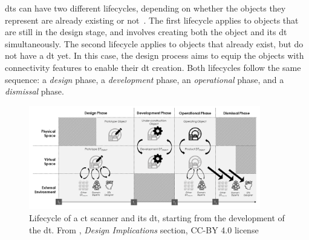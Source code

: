 \acrshort{dt}s can have two different lifecycles, depending on whether the objects they represent are already existing or not~\parencite{barricelliSurveyDigitalTwin2019}. The first lifecycle applies to objects that are still in the design stage, and involves creating both the object and its \acrshort{dt} simultaneously. The second lifecycle applies to objects that already exist, but do not have a \acrshort{dt} yet. In this case, the design process aims to equip the objects with connectivity features to enable their \acrshort{dt} creation. Both lifecycles follow the same sequence: a \textit{design} phase, a \textit{development} phase, an \textit{operational} phase, and a \textit{dismissal} phase.

\begin{figure}
    \centering
    \includegraphics[width=0.9\textwidth]{images/digital_twins/dt_lifecycle_1.png}
    \caption[Lifecycle of a \acrshort{ct} scanner and its \acrshort{dt}, starting from the development of the \acrshort{dt}]{Lifecycle of a \acrshort{ct} scanner and its \acrshort{dt}, starting from the development of the \acrshort{dt}. From \textcite{barricelliSurveyDigitalTwin2019}, \textit{Design Implications} section, CC-BY 4.0 license}
    \label{fig:dt_lifecycle_1}
\end{figure}

